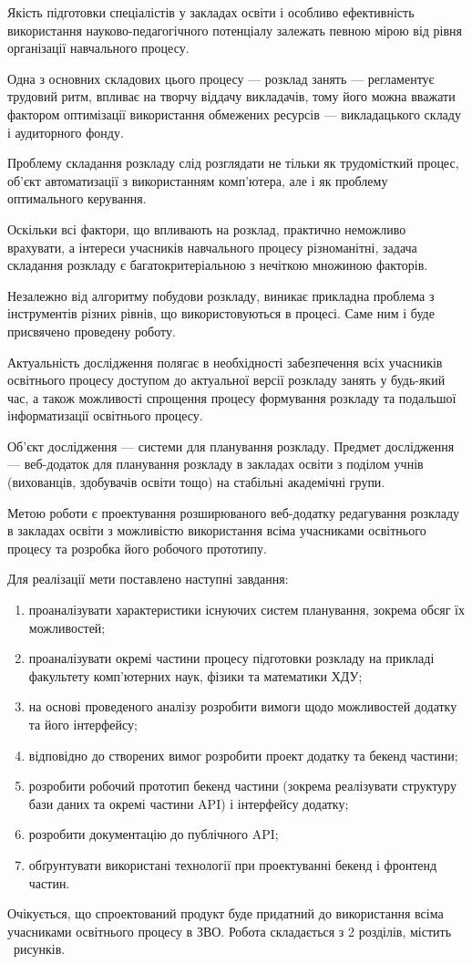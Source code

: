 
Якість підготовки спеціалістів у закладах освіти і особливо ефективність використання науково-педагогічного потенціалу залежать певною мірою від рівня організації навчального процесу.

Одна з основних складових цього процесу — розклад занять — регламентує трудовий ритм, впливає на творчу віддачу викладачів, тому його можна вважати фактором оптимізації використання обмежених ресурсів — викладацького складу і аудиторного фонду.

Проблему складання розкладу слід розглядати не тільки як трудомісткий процес, об'єкт автоматизації з використанням комп’ютера, але і як проблему оптимального керування. 

Оскільки всі фактори, що впливають на розклад, практично неможливо врахувати, а інтереси учасників навчального процесу різноманітні, задача складання розкладу є багатокритеріальною з нечіткою множиною факторів.

Незалежно від алгоритму побудови розкладу, виникає прикладна проблема з інструментів різних рівнів, що використовуються в процесі. Саме ним і буде присвячено проведену роботу.

Актуальність дослідження полягає в необхідності забезпечення всіх учасників освітнього процесу доступом до актуальної версії розкладу занять у будь-який час, а також можливості спрощення процесу формування розкладу та подальшої інформатизації освітнього процесу.

Об’єкт дослідження — системи для планування розкладу. Предмет дослідження —  веб-додаток для планування розкладу в закладах освіти з поділом учнів (вихованців, здобувачів освіти тощо) на стабільні академічні групи.

Метою роботи є проектування розширюваного веб-додатку редагування розкладу в закладах освіти з можливістю використання всіма учасниками освітнього процесу та розробка його робочого прототипу.

Для реалізації мети поставлено наступні завдання:
\begin{enumerate}
	\item проаналізувати характеристики існуючих систем планування, зокрема обсяг їх можливостей;
	
	\item проаналізувати окремі частини процесу підготовки розкладу на прикладі факультету комп’ютерних наук, фізики та математики ХДУ;
	\item на основі проведеного аналізу розробити вимоги щодо можливостей додатку та його інтерфейсу;
	\item відповідно до створених вимог розробити проект додатку та бекенд частини;
	\item розробити робочий прототип бекенд частини (зокрема реалізувати структуру бази даних та окремі частини API) і інтерфейсу додатку;
	\item розробити документацію до публічного API;
	\item обґрунтувати використані технології при проектуванні бекенд і фронтенд частин.
\end{enumerate}

Очікується, що спроектований продукт буде придатний до використання всіма учасниками освітнього процесу в ЗВО.
Робота складається з 2 розділів, містить \totalfigures\ рисунків.
